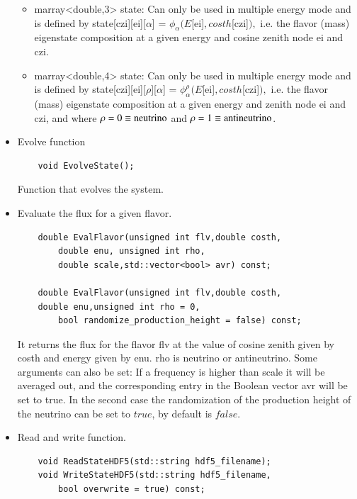 \documentclass[3p,12pt]{elsarticle}
\newcommand{\ttf}{\ttfamily}
\begin{document}
\begin{itemize}
  \begin{itemize}
  \item {\ttf marray<double,3> state}: Can only be used in
    multiple energy mode and is defined by {\ttf
      state[czi][ei][$\alpha$]  = $\phi_\alpha (E$[ei]$,costh$[czi]$),$ } i.e. the
    flavor (mass) eigenstate composition at a given energy and cosine
    zenith node {\ttf ei} and {\ttf czi}. 
  \item {\ttf marray<double,4> state}: Can only be used in
    multiple energy mode and is defined by {\ttf
      state[czi][ei][$\rho$][$\alpha$]  = $\phi^{\rho}_\alpha
      (E$[ei]$,costh$[czi]$),$ } i.e. the flavor (mass) eigenstate
    composition at a given energy and zenith node {\ttf ei} and {\ttf czi}, and where
    $\rho = 0 \equiv {\rm neutrino}$ and $\rho = 1 \equiv {\rm
      antineutrino}$. 
  \end{itemize}
  
\item Evolve function
  \begin{lstlisting}
    void EvolveState();
  \end{lstlisting}
  Function that evolves the system.

\item Evaluate the flux for a given flavor.
  \begin{lstlisting}
    double EvalFlavor(unsigned int flv,double costh,
        double enu, unsigned int rho,
        double scale,std::vector<bool> avr) const;

    double EvalFlavor(unsigned int flv,double costh,
    double enu,unsigned int rho = 0,
        bool randomize_production_height = false) const;
  \end{lstlisting}
  It returns the flux for the flavor {\ttf flv} at the value of cosine
  zenith given by {\ttf costh} and energy given by {\ttf enu}.
  {\ttf rho} is {\ttf neutrino} or {\ttf antineutrino}.
  Some arguments can also be set: If a frequency is higher than {\ttf
    scale} it will be averaged out, and the corresponding entry in the
  Boolean vector {\ttf avr} will be set to {\ttf true}.
  In the second case the randomization of the production height of the
  neutrino can be set to $true$, by default is $false$.
  
\item Read and write function.
  \begin{lstlisting}
    void ReadStateHDF5(std::string hdf5_filename);
    void WriteStateHDF5(std::string hdf5_filename,
        bool overwrite = true) const;
  \end{lstlisting}
  

\end{itemize}
\end{document}

